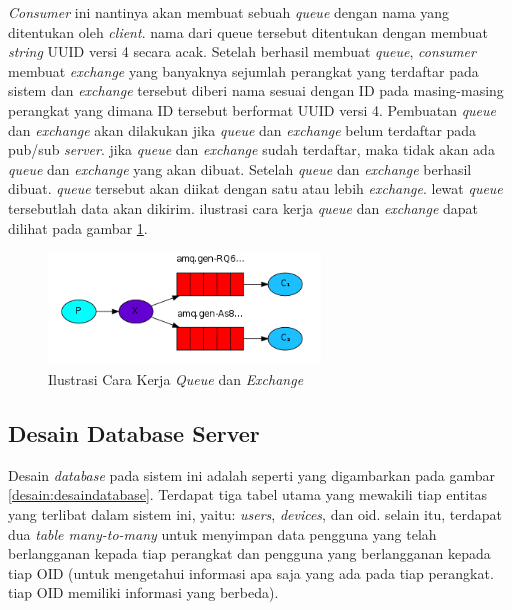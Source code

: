 			\textit{Consumer} ini nantinya akan membuat sebuah \textit{queue} dengan nama yang ditentukan oleh \textit{client}. nama dari queue tersebut ditentukan dengan membuat \textit{string} UUID versi 4 secara acak. Setelah berhasil membuat \textit{queue}, \textit{consumer} membuat \textit{exchange} yang banyaknya sejumlah perangkat yang terdaftar pada sistem dan \textit{exchange} tersebut diberi nama sesuai dengan ID pada masing-masing perangkat yang dimana ID tersebut berformat UUID versi 4. Pembuatan \textit{queue} dan \textit{exchange} akan dilakukan jika \textit{queue} dan \textit{exchange} belum terdaftar pada pub/sub \textit{server}. jika \textit{queue} dan \textit{exchange} sudah terdaftar, maka tidak akan ada \textit{queue} dan \textit{exchange} yang akan dibuat. Setelah \textit{queue} dan \textit{exchange} berhasil dibuat. \textit{queue} tersebut akan diikat dengan satu atau lebih \textit{exchange}. lewat \textit{queue} tersebutlah data akan dikirim. ilustrasi cara kerja \textit{queue} dan \textit{exchange} dapat dilihat pada gambar \ref{desain:consumer}.
			\begin{figure}[H]
				\centering
				\includegraphics[height=3cm]{Images/C-3/pubsubillus.png}
				\caption{Ilustrasi Cara Kerja \textit{Queue} dan \textit{Exchange}}
				\label{desain:consumer}
			\end{figure}

        \subsection{Desain Database Server}        	
        	Desain \textit{database} pada sistem ini adalah seperti yang digambarkan pada gambar \ref{desain:desaindatabase}. Terdapat tiga tabel utama yang mewakili tiap entitas yang terlibat dalam sistem ini, yaitu: \textit{users}, \textit{devices}, dan oid. selain itu, terdapat dua \textit{table many-to-many} untuk menyimpan data pengguna yang telah berlangganan kepada tiap perangkat dan pengguna yang berlangganan kepada tiap OID (untuk mengetahui informasi apa saja yang ada pada tiap perangkat. tiap OID memiliki informasi yang berbeda).
        	

